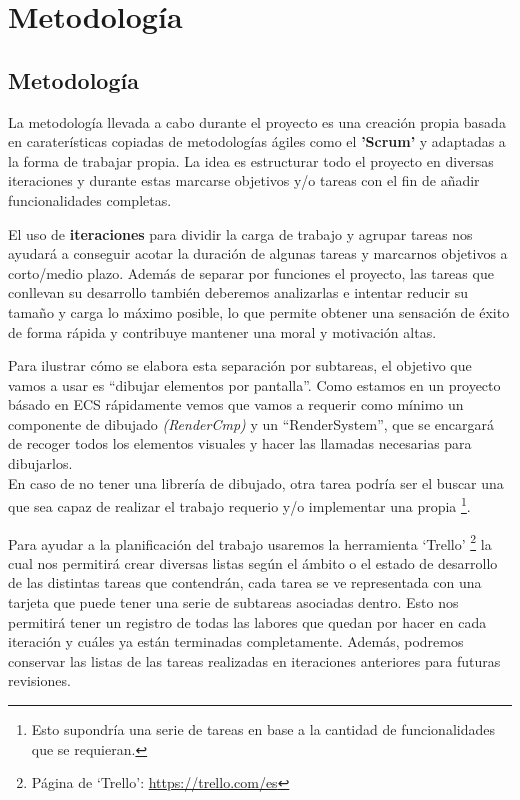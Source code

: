 \chapter{Metodología}
\label{metodologia}

\section{Metodología}
La metodología llevada a cabo durante el proyecto es una creación propia basada en caraterísticas
copiadas de metodologías ágiles como el \textbf{'Scrum'} y adaptadas a la forma de trabajar propia.
La idea es estructurar todo el proyecto en diversas iteraciones y durante estas marcarse
objetivos y/o tareas con el fin de añadir funcionalidades completas.

El uso de \textbf{iteraciones} para dividir la carga de trabajo y agrupar tareas nos ayudará
a conseguir acotar la duración de algunas tareas y marcarnos objetivos a corto/medio
plazo. Además de separar por funciones el proyecto, las tareas que conllevan su desarrollo
también deberemos analizarlas e intentar reducir su tamaño y carga lo máximo posible, lo que
permite obtener una sensación de éxito de forma rápida y contribuye mantener una moral y 
motivación altas.

Para ilustrar cómo se elabora esta separación por subtareas, el objetivo que vamos a
usar es ``dibujar elementos por pantalla''. Como estamos en un proyecto básado en \ac{ECS} rápidamente
vemos que vamos a requerir como mínimo un componente de dibujado \textit{(RenderCmp)} y un 
``RenderSystem'', que se encargará de recoger todos los elementos visuales y hacer las
llamadas necesarias para dibujarlos. \\
En caso de no tener una librería de dibujado, otra tarea podría ser el buscar una que sea capaz
de realizar el trabajo requerio y/o implementar una propia
\footnote{Esto supondría una serie de tareas en base a la cantidad de funcionalidades que se requieran.}. 

Para ayudar a la planificación del trabajo usaremos la herramienta `Trello'
\footnote{Página de `Trello': \url{https://trello.com/es}}
la cual nos permitirá crear diversas listas según el ámbito o el estado de
desarrollo de las distintas tareas que contendrán, cada tarea se ve representada con
una tarjeta que puede tener una serie de subtareas asociadas dentro. Esto nos
permitirá tener un registro de todas las labores que quedan por hacer en cada iteración y
cuáles ya están terminadas completamente. Además, podremos conservar las listas de las tareas
realizadas en iteraciones anteriores para futuras revisiones.

